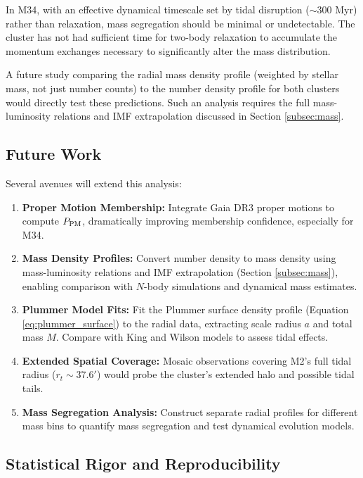 \documentclass[linenumbers,trackchanges,twocolumn]{aastex701}
\begin{document}
In M34, with an effective dynamical timescale set by tidal disruption ($\sim 300$ Myr) rather than relaxation, mass segregation should be minimal or undetectable. The cluster has not had sufficient time for two-body relaxation to accumulate the momentum exchanges necessary to significantly alter the mass distribution.

A future study comparing the radial mass density profile (weighted by stellar mass, not just number counts) to the number density profile for both clusters would directly test these predictions. Such an analysis requires the full mass-luminosity relations and IMF extrapolation discussed in Section \ref{subsec:mass}.

\subsection{Future Work}

Several avenues will extend this analysis:

\begin{enumerate}
\item \textbf{Proper Motion Membership:} Integrate Gaia DR3 proper motions to compute $P_{\rm PM}$, dramatically improving membership confidence, especially for M34.

\item \textbf{Mass Density Profiles:} Convert number density to mass density using mass-luminosity relations and IMF extrapolation (Section \ref{subsec:mass}), enabling comparison with $N$-body simulations and dynamical mass estimates.

\item \textbf{Plummer Model Fits:} Fit the Plummer surface density profile (Equation \ref{eq:plummer_surface}) to the radial data, extracting scale radius $a$ and total mass $M$. Compare with King and Wilson models to assess tidal effects.

\item \textbf{Extended Spatial Coverage:} Mosaic observations covering M2's full tidal radius ($r_t \sim 37.6'$) would probe the cluster's extended halo and possible tidal tails.

\item \textbf{Mass Segregation Analysis:} Construct separate radial profiles for different mass bins to quantify mass segregation and test dynamical evolution models.
\end{enumerate}

\subsection{Statistical Rigor and Reproducibility}
\end{document}
